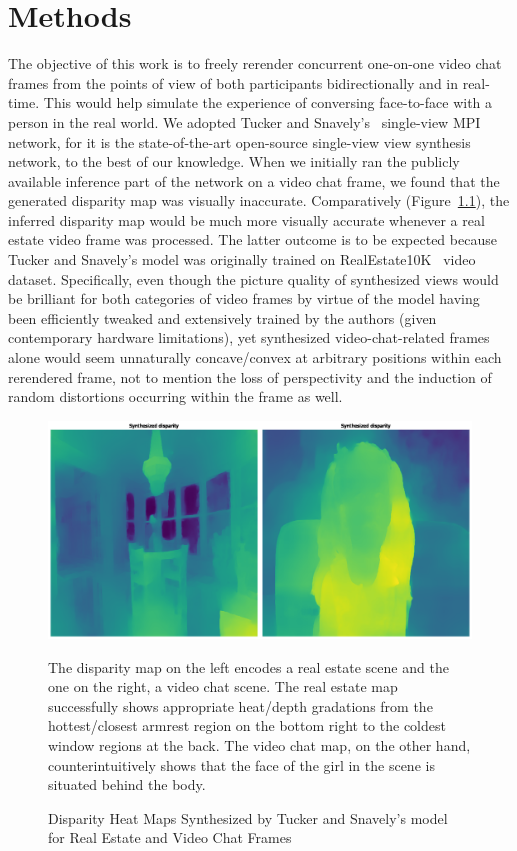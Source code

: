 \chapter{Methods}\label{ch3:methods}

The objective of this work is to freely rerender concurrent one-on-one video chat frames from the points of view of both participants bidirectionally and in real-time. This would help simulate the experience of conversing face-to-face with a person in the real world. We adopted Tucker and Snavely's~\cite{single_view_mpi} single-view MPI network, for it is the state-of-the-art open-source single-view view synthesis network, to the best of our knowledge. When we initially ran the publicly available inference part of the network on a video chat frame, we found that the generated disparity map was visually inaccurate. Comparatively (Figure~\ref{fig:great-off-kilter-disparity}), the inferred disparity map would be much more visually accurate whenever a real estate video frame was processed. The latter outcome is to be expected because Tucker and Snavely's model was originally trained on RealEstate10K~\cite{zhou2018stereo} video dataset. Specifically, even though the picture quality of synthesized views would be brilliant for both categories of video frames by virtue of the model having been efficiently tweaked and extensively trained by the authors (given contemporary hardware limitations), yet synthesized video-chat-related frames alone would seem unnaturally concave/convex at arbitrary positions within each rerendered frame, not to mention the loss of perspectivity and the induction of random distortions occurring within the frame as well.

\begin{figure}[!h]
    \includegraphics[width=1\columnwidth]{figures/great-off-kilter-disparity.png}
    \caption{Disparity Heat Maps Synthesized by Tucker and Snavely's model~\cite{single_view_mpi} for Real Estate and Video Chat Frames}
    \label{fig:great-off-kilter-disparity}
    {\small The disparity map on the left encodes a real estate scene and the one on the right, a video chat scene. The real estate map successfully shows appropriate heat/depth gradations from the hottest/closest armrest region on the bottom right to the coldest window regions at the back. The video chat map, on the other hand, counterintuitively shows that the face of the girl in the scene is situated behind the body.}  
\end{figure}

